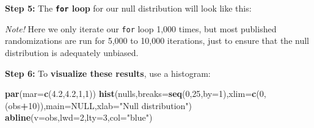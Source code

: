 \documentclass[
]{book}
\newenvironment{Shaded}{\begin{snugshade}}{\end{snugshade}}
\newcommand{\CommentTok}[1]{\textcolor[rgb]{0.56,0.35,0.01}{\textit{#1}}}
\newcommand{\ControlFlowTok}[1]{\textcolor[rgb]{0.13,0.29,0.53}{\textbf{#1}}}
\newcommand{\DataTypeTok}[1]{\textcolor[rgb]{0.13,0.29,0.53}{#1}}
\newcommand{\DecValTok}[1]{\textcolor[rgb]{0.00,0.00,0.81}{#1}}
\newcommand{\FloatTok}[1]{\textcolor[rgb]{0.00,0.00,0.81}{#1}}
\newcommand{\KeywordTok}[1]{\textcolor[rgb]{0.13,0.29,0.53}{\textbf{#1}}}
\newcommand{\NormalTok}[1]{#1}
\newcommand{\OperatorTok}[1]{\textcolor[rgb]{0.81,0.36,0.00}{\textbf{#1}}}
\newcommand{\OtherTok}[1]{\textcolor[rgb]{0.56,0.35,0.01}{#1}}
\newcommand{\StringTok}[1]{\textcolor[rgb]{0.31,0.60,0.02}{#1}}
\begin{document}
\textbf{Step 5:} The \textbf{\texttt{for} loop} for our null distribution will look like this:

\begin{Shaded}
\end{Shaded}

\emph{Note!} Here we only iterate our \texttt{for} loop 1,000 times, but most published randomizations are run for 5,000 to 10,000 iterations, just to ensure that the null distribution is adequately unbiased.

\textbf{Step 6:} To \textbf{visualize these results}, use a histogram:

\begin{Shaded}
\begin{Highlighting}[]
\KeywordTok{par}\NormalTok{(}\DataTypeTok{mar=}\KeywordTok{c}\NormalTok{(}\FloatTok{4.2}\NormalTok{,}\FloatTok{4.2}\NormalTok{,}\DecValTok{1}\NormalTok{,}\DecValTok{1}\NormalTok{))}
\KeywordTok{hist}\NormalTok{(nulls,}\DataTypeTok{breaks=}\KeywordTok{seq}\NormalTok{(}\DecValTok{0}\NormalTok{,}\DecValTok{25}\NormalTok{,}\DataTypeTok{by=}\DecValTok{1}\NormalTok{),}\DataTypeTok{xlim=}\KeywordTok{c}\NormalTok{(}\DecValTok{0}\NormalTok{,(obs}\OperatorTok{+}\DecValTok{10}\NormalTok{)),}\DataTypeTok{main=}\OtherTok{NULL}\NormalTok{,}\DataTypeTok{xlab=}\StringTok{"Null distribution"}\NormalTok{)}
\KeywordTok{abline}\NormalTok{(}\DataTypeTok{v=}\NormalTok{obs,}\DataTypeTok{lwd=}\DecValTok{2}\NormalTok{,}\DataTypeTok{lty=}\DecValTok{3}\NormalTok{,}\DataTypeTok{col=}\StringTok{"blue"}\NormalTok{)}
\end{Highlighting}
\end{Shaded}
\end{document}
